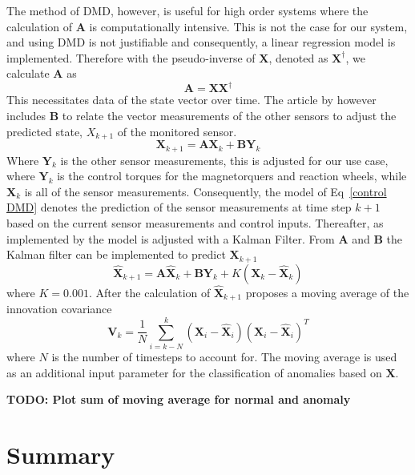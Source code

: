The method of DMD, however, is useful for high order systems where the calculation of $\mathbf{A}$ is computationally intensive. This is not the case for our system, and using DMD is not justifiable and consequently, a linear regression model is implemented. Therefore with the pseudo-inverse of $\mathbf{X}$, denoted as $\mathbf{X^{\dagger}}$, we calculate $\mathbf{A}$ as
\begin{equation}
	\mathbf{A} = \mathbf{X}\mathbf{X^{\dagger}}
\end{equation}
This necessitates data of the state vector over time. The article by \cite{DeSilva2020} however includes $\mathbf{B}$ to relate the vector measurements of the other sensors to adjust the predicted state, $X_{k+1}$ of the monitored sensor. 
\begin{equation}
	\mathbf{X}_{k+1} = \mathbf{AX}_k + \mathbf{BY}_k
	\label{control DMD}
\end{equation}
Where $\mathbf{Y}_k$ is the other sensor measurements, this is adjusted for our use case, where $\mathbf{Y}_k$ is the control torques for the magnetorquers and reaction wheels, while $\mathbf{X}_k$ is all of the sensor measurements. Consequently, the model of Eq~\ref{control DMD} denotes the prediction of the sensor measurements at time step $k+1$ based on the current sensor measurements and control inputs.
Thereafter, as implemented by \cite{DeSilva2020} the model is adjusted with a Kalman Filter. From $\mathbf{A}$ and $\mathbf{B}$ the Kalman filter can be implemented to predict $\mathbf{X}_{k+1}$
\begin{equation}
	\hat{\mathbf{X}}_{k+1} = \mathbf{A}\hat{\mathbf{X}}_k + \mathbf{B}\mathbf{Y}_k + K(\mathbf{X}_k - \hat{\mathbf{X}}_k)
\end{equation}
where $K = 0.001$. After the calculation of $\hat{\mathbf{X}}_{k+1}$ \cite{DeSilva2020} proposes a moving average of the innovation covariance
\begin{equation}
	\mathbf{V}_k = \frac{1}{N} \sum_{i=k-N}^k (\mathbf{X}_i - \hat{\mathbf{X}}_i)(\mathbf{X}_i - \hat{\mathbf{X}}_i)^T
\end{equation}
where $N$ is the number of timesteps to account for. The moving average is used as an additional input parameter for the classification of anomalies based on $\mathbf{X}$.

\textbf{TODO: Plot sum of moving average for normal and anomaly}

\section{Summary}